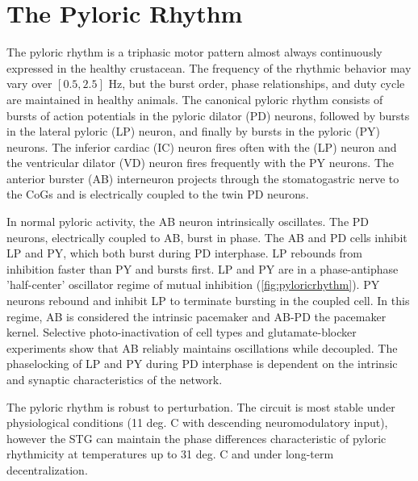 \section{The Pyloric Rhythm}
The pyloric rhythm is a triphasic motor pattern almost always continuously expressed in the healthy crustacean\autocite{ClemensLongtermexpressiontwo1998,RezerExpressioncrustaceanpyloric1983}. The frequency of the rhythmic behavior may vary over $[0.5, 2.5]$ Hz, but the burst order, phase relationships, and duty cycle are maintained in healthy animals\autocite{MarderUnderstandingCircuitDynamics2007}. The canonical pyloric rhythm consists of bursts of action potentials in the pyloric dilator (\acs{PD}) neurons, followed by bursts in the lateral pyloric (\acs{LP}) neuron, and finally by bursts in the pyloric (\acs{PY}) neurons. The inferior cardiac (\acs{IC}) neuron fires often with the (\acs{LP}) neuron and the ventricular dilator (\acs{VD}) neuron fires frequently with the PY neurons\autocite{Harris-WarrickDynamicBiologicalNetworks1992}. The anterior burster (\acs{AB}) interneuron projects through the stomatogastric nerve to the \acsp{CoG} and is electrically coupled to the twin \acs{PD} neurons. 

In normal pyloric activity, the \acs{AB} neuron intrinsically oscillates. The \acs{PD} neurons, electrically coupled to \acs{AB}, burst in phase. The \acs{AB} and \acs{PD} cells inhibit \acs{LP} and \acs{PY}, which both burst during \acs{PD} interphase. \acs{LP} rebounds from inhibition faster than \acs{PY} and bursts first. \acs{LP} and \acs{PY} are in a phase-antiphase ’half-center’ oscillator regime of mutual inhibition (\autoref{fig:pyloricrhythm}). \acs{PY} neurons rebound and inhibit \acs{LP} to terminate bursting in the coupled cell\autocite{MarderUnderstandingCircuitDynamics2007,HooperModulationlobsterpyloric1987,Harris-WarrickDynamicBiologicalNetworks1992}. In this regime, \acs{AB} is considered the intrinsic pacemaker and \acs{AB}-\acs{PD} the pacemaker kernel. Selective photo-inactivation of cell types and glutamate-blocker experiments show that \acs{AB} reliably maintains oscillations while decoupled\autocite{SelverstonCrustaceanStomatogastricSystem1987}. The phaselocking of \acs{LP} and \acs{PY} during \acs{PD} interphase is dependent on the intrinsic and synaptic characteristics of the network. 

The pyloric rhythm is robust to perturbation. The circuit is most stable under physiological conditions (11 deg. C with descending neuromodulatory input), however the STG can maintain the phase differences characteristic of pyloric rhythmicity at temperatures up to 31 deg. C and under long-term decentralization\autocite{HaddadCircuitrobustnesstemperature2017,TangRobustnessrhythmiccircuit2012,HamoodConsequencesacutelongterm2015,GoldmanGlobalStructureRobustness2001}.

